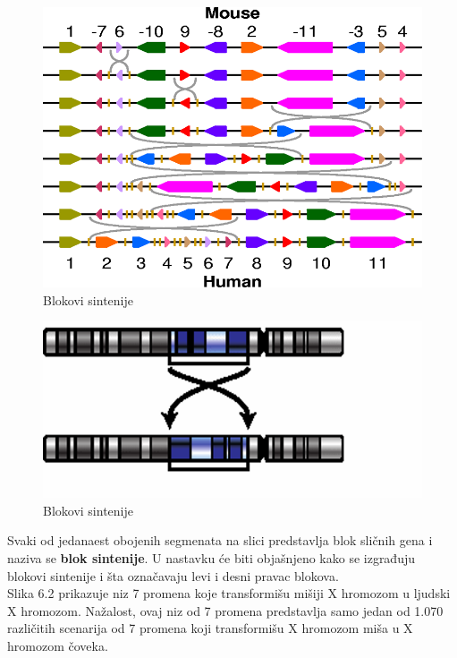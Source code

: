 \begin{figure}[h!]
\centering
\includegraphics[scale=0.7]{poglavlja/6/slike/transformacija.png}
\caption{Blokovi sintenije}
\label{slika:X}
\end{figure}


\begin{figure}[h!]
\centering
\includegraphics[scale=0.7]{poglavlja/6/slike/transformacijaa.png}
\caption{Blokovi sintenije}
\label{slika:X}
\end{figure}

Svaki od jedanaest obojenih segmenata na slici predstavlja blok sličnih gena i naziva se \textbf{blok sintenije}. U nastavku će biti objašnjeno kako se izgrađuju blokovi sintenije i šta označavaju levi i desni pravac blokova.\\

Slika 6.2 prikazuje niz 7 promena koje transformišu mišiji X hromozom u ljudski X hromozom. Nažalost, ovaj niz od 7 promena predstavlja samo jedan od 1.070 različitih scenarija od 7 promena koji transformišu X hromozom miša u X hromozom čoveka.\\

